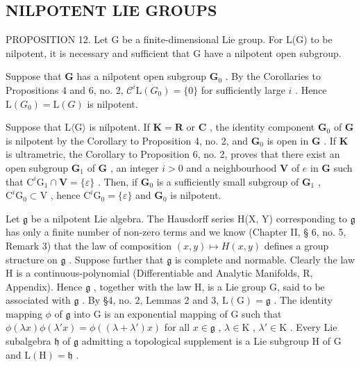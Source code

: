 \subsection{NILPOTENT LIE GROUPS}

PROPOSITION 12. Let G be a finite-dimensional Lie group. For L(G) to be nilpotent, it is necessary and sufficient that G have a nilpotent open subgroup.

Suppose that \(\mathbf{G}\) has a nilpotent open subgroup \(\mathbf{G}_0\) . By the Corollaries to Propositions 4 and 6, no. 2, \(\mathcal{C}^i\mathrm{L}(G_0) = \{0\}\) for sufficiently large \(i\) . Hence \(\mathrm{L}(G_0) = \mathrm{L}(G)\) is nilpotent.

Suppose that \(\mathrm{L}\langle \mathrm{G}\rangle\) is nilpotent. If \(\mathbf{K} = \mathbf{R}\) or \(\mathbf{C}\) , the identity component \(\mathbf{G}_0\) of \(\mathbf{G}\) is nilpotent by the Corollary to Proposition 4, no. 2, and \(\mathbf{G}_0\) is open in \(\mathbf{G}\) . If \(\mathbf{K}\) is ultrametric, the Corollary to Proposition 6, no. 2, proves that there exist an open subgroup \(\mathbf{G}_1\) of \(\mathbf{G}\) , an integer \(i > 0\) and a neighbourhood \(\mathbf{V}\) of \(e\) in \(\mathbf{G}\) such that \(\mathrm{C}^i\mathrm{G}_1\cap \mathbf{V} = \{\varepsilon \}\) . Then, if \(\mathbf{G}_0\) is a sufficiently small subgroup of \(\mathbf{G}_1\) , \(\mathrm{C}^i\mathrm{G}_0\subset \mathrm{V}\) , hence \(\mathrm{C}^i\mathrm{G}_0 = \{\varepsilon \}\) and \(\mathbf{G}_0\) is nilpotent.

Let \(\mathfrak{g}\) be a nilpotent Lie algebra. The Hausdorff series H(X, Y) corresponding to \(\mathfrak{g}\) has only a finite number of non-zero terms and we know (Chapter II, § 6, no. 5, Remark 3) that the law of composition \((x, y) \mapsto H(x, y)\) defines a group structure on \(\mathfrak{g}\) . Suppose further that \(\mathfrak{g}\) is complete and normable. Clearly the law H is a continuous-polynomial (Differentiable and Analytic Manifolds, R, Appendix). Hence \(\mathfrak{g}\) , together with the law H, is a Lie group G, said to be associated with \(\mathfrak{g}\) . By §4, no. 2, Lemmas 2 and 3, \(\mathrm{L}(\mathrm{G}) = \mathfrak{g}\) . The identity mapping \(\phi\) of \(\mathfrak{g}\) into \(\mathrm{G}\) is an exponential mapping of \(\mathrm{G}\) such that \(\phi(\lambda x)\phi(\lambda' x) = \phi((\lambda + \lambda') x)\) for all \(x \in \mathfrak{g}\) , \(\lambda \in \mathrm{K}\) , \(\lambda' \in \mathrm{K}\) . Every Lie subalgebra \(\mathfrak{h}\) of \(\mathfrak{g}\) admitting a topological supplement is a Lie subgroup \(\mathrm{H}\) of \(\mathrm{G}\) and \(\mathrm{L}(\mathrm{H}) = \mathfrak{h}\) .

